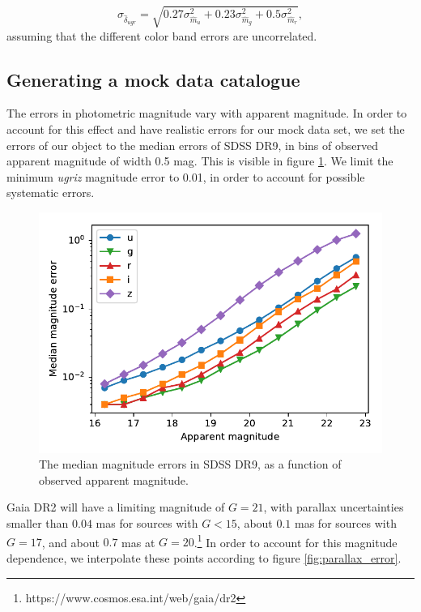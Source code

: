 \documentclass[fleqn,usenatbib]{mnras}
\begin{document}
\begin{equation}
	\sigma_{\hat{\delta}_{ugr}} = \sqrt{ 0.27 \sigma_{\hat{m}_u}^2 + 0.23 \sigma_{\hat{m}_g}^2 + 0.5 \sigma_{\hat{m}_r}^2 },
\end{equation}
assuming that the different color band errors are uncorrelated.


\subsection{Generating a mock data catalogue}

The errors in photometric magnitude vary with apparent magnitude. In order to account for this effect and have realistic errors for our mock data set, we set the errors of our object to the median errors of SDSS DR9, in bins of observed apparent magnitude of width 0.5 mag. This is visible in figure \ref{fig:magnitude_error}. We limit the minimum \emph{ugriz} magnitude error to 0.01, in order to account for possible systematic errors.

\begin{figure}
	\includegraphics[width=\columnwidth]{median_app_errors.pdf}
    \caption{The median magnitude errors in SDSS DR9, as a function of observed apparent magnitude.}
    \label{fig:magnitude_error}
\end{figure}

Gaia DR2 will have a limiting magnitude of $G=21$, with parallax uncertainties smaller than $0.04$ mas for sources with $G<15$, about $0.1$ mas for sources with $G=17$, and about $0.7$ mas at $G=20$.\footnote{https://www.cosmos.esa.int/web/gaia/dr2} In order to account for this magnitude dependence, we interpolate these points according to figure \ref{fig:parallax_error}.
\end{document}
